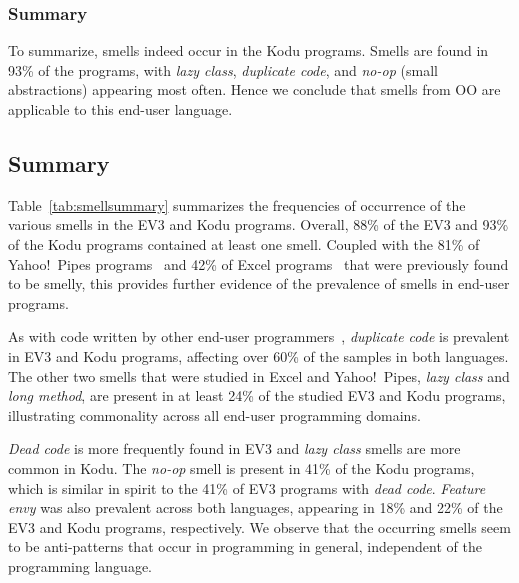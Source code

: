\documentclass[conference]{IEEEtran}
\begin{document}
\subsubsection{Summary}
To summarize, smells indeed occur in the Kodu programs. Smells are found in 93\% of the programs, with \emph{lazy class}, \emph{duplicate code},  and \emph{no-op} (small abstractions) appearing most often. Hence we conclude that smells from OO are applicable to this end-user language. 

\subsection{Summary}
Table~\ref{tab:smellsummary} summarizes the frequencies of occurrence of the various smells in the EV3 and Kodu programs. Overall, 88\% of the EV3 and 93\% of the Kodu programs contained at least one smell. Coupled with the 81\% of Yahoo!\ Pipes programs~\cite{StoleeTSE2013} and 42\% of Excel programs~\cite{Hermans2012intra} that were previously found to be smelly, this provides further evidence of the prevalence of smells in end-user programs. 

As with code written by other end-user programmers~\cite{StoleeTSE2013}, \emph{duplicate code} is prevalent in EV3 and Kodu programs, affecting over 60\% of the samples in both languages. The other two smells that were studied in Excel and Yahoo!\ Pipes, \emph{lazy class} and \emph{long method}, are present in at least 24\% of the studied EV3 and Kodu programs, illustrating commonality across all end-user programming domains. 

\emph{Dead code} is more frequently found in EV3 and \emph{lazy class} smells are more common in Kodu. The \emph{no-op} smell is present in 41\% of the Kodu programs, which is similar in spirit to the 41\% of EV3 programs with \emph{dead code}. \emph{Feature envy} was also prevalent across both languages, appearing in 18\% and 22\% of the EV3 and Kodu programs, respectively. 
We observe that the occurring smells seem to be anti-patterns that occur in programming in general, independent of the programming language. 
\end{document}
